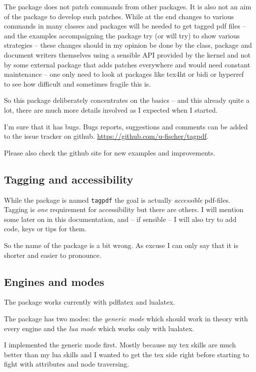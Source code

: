 \documentclass[DIV=12,parskip=half-,bibliography=totoc]{scrartcl}
\begin{document}
The package does not patch commands from other packages. It is also not an aim of the package to develop such patches. While at the end changes to various commands in many classes and packages will be needed to get tagged pdf files -- and the examples accompaigning the package try (or will try) to show various strategies -- these changes should in my opinion be done by the class, package and document writers themselves using a sensible API provided by the kernel and not by some external package that adds patches everywhere and would need constant maintenance -- one only need to look at packages like tex4ht or bidi or hyperref to see how difficult and sometimes fragile this is.

So this package deliberately concentrates on the basics -- and this already quite a lot, there are much more details involved as I expected when I started.

I'm sure that it has bugs. Bugs reports, suggestions and comments can be added to the issue tracker on github. \url{https://github.com/u-fischer/tagpdf}.

Please also check the github site for new examples and improvements.


\subsection{Tagging and accessibility}

While the package is named \texttt{tagpdf} the goal is actually \emph{accessible} pdf-files. Tagging is \emph{one} requirement for accessibility but there are others. I will mention some later on in this documentation, and -- if sensible -- I will also try to add code, keys or tips for them.

So the name of the package is a bit wrong. As excuse I can only say that it is shorter and easier to pronounce.


\subsection{Engines and modes}

The package works currently with pdflatex and lualatex.

The package has two modes: the \emph{generic mode} which should work in theory with every engine and the \emph{lua mode} which works only with lualatex.

I implemented the generic mode first. Mostly because my tex skills are much better than my lua skills and I wanted to get the tex side right before starting to fight with attributes and node traversing.
\end{document}
